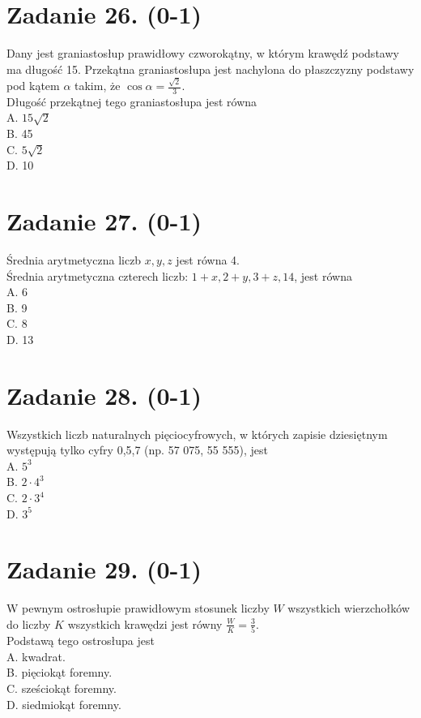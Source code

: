 \documentclass[10pt]{article}
\begin{document}
\section*{Zadanie 26. (0-1)}
Dany jest graniastosłup prawidłowy czworokątny, w którym krawędź podstawy ma długość 15. Przekątna graniastosłupa jest nachylona do płaszczyzny podstawy pod kątem \(\alpha\) takim, że \(\cos \alpha=\frac{\sqrt{2}}{3}\).\\
Długość przekątnej tego graniastosłupa jest równa\\
A. \(15 \sqrt{2}\)\\
B. 45\\
C. \(5 \sqrt{2}\)\\
D. 10

\section*{Zadanie 27. (0-1)}
Średnia arytmetyczna liczb \(x, y, z\) jest równa 4.\\
Średnia arytmetyczna czterech liczb: \(1+x, 2+y, 3+z, 14\), jest równa\\
A. 6\\
B. 9\\
C. 8\\
D. 13

\section*{Zadanie 28. (0-1)}
Wszystkich liczb naturalnych pięciocyfrowych, w których zapisie dziesiętnym występują tylko cyfry 0,5,7 (np. 57 075, 55 555), jest\\
A. \(5^{3}\)\\
B. \(2 \cdot 4^{3}\)\\
C. \(2 \cdot 3^{4}\)\\
D. \(3^{5}\)

\section*{Zadanie 29. (0-1)}
W pewnym ostrosłupie prawidłowym stosunek liczby \(W\) wszystkich wierzchołków do liczby \(K\) wszystkich krawędzi jest równy \(\frac{W}{K}=\frac{3}{5}\).\\
Podstawą tego ostrosłupa jest\\
A. kwadrat.\\
B. pięciokąt foremny.\\
C. sześciokąt foremny.\\
D. siedmiokąt foremny.
\end{document}

